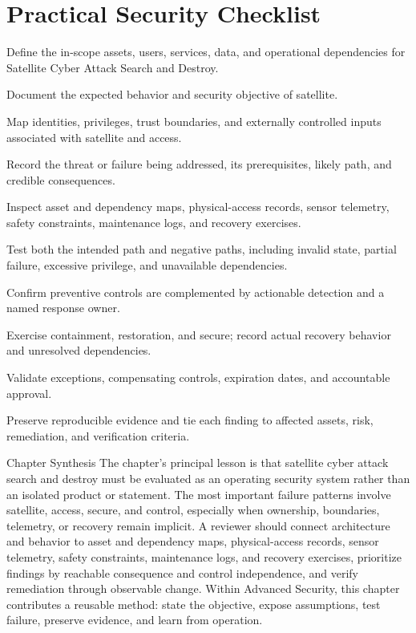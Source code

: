 \documentclass[11pt,letterpaper]{article}
\begin{document}
\section*{Practical Security Checklist}
\begin{CornellChecklist}
\item Define the in-scope assets, users, services, data, and operational dependencies for Satellite Cyber Attack Search and Destroy.
\item Document the expected behavior and security objective of satellite.
\item Map identities, privileges, trust boundaries, and externally controlled inputs associated with satellite and access.
\item Record the threat or failure being addressed, its prerequisites, likely path, and credible consequences.
\item Inspect asset and dependency maps, physical-access records, sensor telemetry, safety constraints, maintenance logs, and recovery exercises.
\item Test both the intended path and negative paths, including invalid state, partial failure, excessive privilege, and unavailable dependencies.
\item Confirm preventive controls are complemented by actionable detection and a named response owner.
\item Exercise containment, restoration, and secure; record actual recovery behavior and unresolved dependencies.
\item Validate exceptions, compensating controls, expiration dates, and accountable approval.
\item Preserve reproducible evidence and tie each finding to affected assets, risk, remediation, and verification criteria.
\end{CornellChecklist}
\begin{CornellSummaryBox}{Chapter Synthesis}
The chapter's principal lesson is that satellite cyber attack search and destroy must be evaluated as an operating security system rather than an isolated product or statement. The most important failure patterns involve satellite, access, secure, and control, especially when ownership, boundaries, telemetry, or recovery remain implicit. A reviewer should connect architecture and behavior to asset and dependency maps, physical-access records, sensor telemetry, safety constraints, maintenance logs, and recovery exercises, prioritize findings by reachable consequence and control independence, and verify remediation through observable change. Within Advanced Security, this chapter contributes a reusable method: state the objective, expose assumptions, test failure, preserve evidence, and learn from operation.
\end{CornellSummaryBox}
\end{document}
